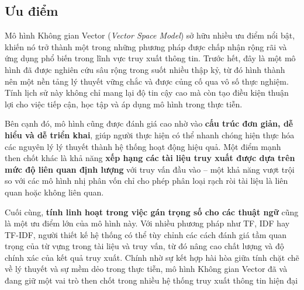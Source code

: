 \subsection{Ưu điểm}
Mô hình Không gian Vector (\textit{Vector Space Model}) sở hữu nhiều ưu điểm nổi bật, khiến nó trở thành một trong những phương pháp được chấp nhận rộng rãi và ứng dụng phổ biến trong lĩnh vực truy xuất thông tin. Trước hết, đây là một mô hình đã được nghiên cứu sâu rộng trong suốt nhiều thập kỷ, từ đó hình thành nên một nền tảng lý thuyết vững chắc và được củng cố qua vô số thực nghiệm. Tính lịch sử này không chỉ mang lại độ tin cậy cao mà còn tạo điều kiện thuận lợi cho việc tiếp cận, học tập và áp dụng mô hình trong thực tiễn.

Bên cạnh đó, mô hình cũng được đánh giá cao nhờ vào \textbf{cấu trúc đơn giản, dễ hiểu và dễ triển khai}, giúp người thực hiện có thể nhanh chóng hiện thực hóa các nguyên lý lý thuyết thành hệ thống hoạt động hiệu quả. Một điểm mạnh then chốt khác là khả năng \textbf{xếp hạng các tài liệu truy xuất được dựa trên mức độ liên quan định lượng} với truy vấn đầu vào -- một khả năng vượt trội so với các mô hình nhị phân vốn chỉ cho phép phân loại rạch ròi tài liệu là liên quan hoặc không liên quan.

Cuối cùng, \textbf{tính linh hoạt trong việc gán trọng số cho các thuật ngữ} cũng là một ưu điểm lớn của mô hình này. Với nhiều phương pháp như TF, IDF hay TF-IDF, người thiết kế hệ thống có thể tùy chỉnh các cách đánh giá tầm quan trọng của từ vựng trong tài liệu và truy vấn, từ đó nâng cao chất lượng và độ chính xác của kết quả truy xuất. Chính nhờ sự kết hợp hài hòa giữa tính chặt chẽ về lý thuyết và sự mềm dẻo trong thực tiễn, mô hình Không gian Vector đã và đang giữ một vai trò then chốt trong nhiều hệ thống truy xuất thông tin hiện đại
